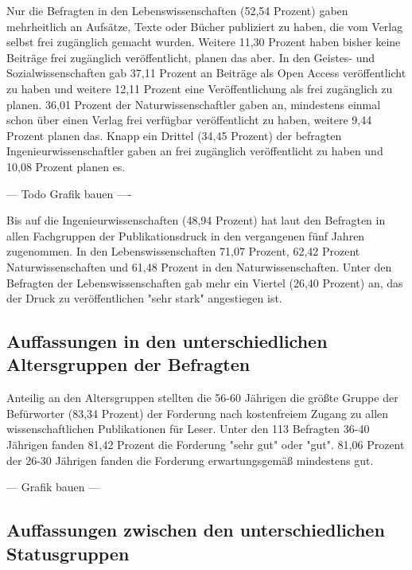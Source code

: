 Nur die Befragten in den Lebenswissenschaften (52,54 Prozent) gaben mehrheitlich an Aufsätze, Texte oder Bücher publiziert zu haben, die vom Verlag selbst frei zugänglich gemacht wurden. Weitere 11,30 Prozent haben bisher keine Beiträge frei zugänglich veröffentlicht, planen das aber. In den Geistes- und Sozialwissenschaften gab 37,11 Prozent an Beiträge als Open Access veröffentlicht zu haben und weitere 12,11 Prozent eine Veröffentlichung als frei zugänglich zu planen. 36,01 Prozent der Naturwissenschaftler gaben an, mindestens einmal schon über einen Verlag frei verfügbar veröffentlicht zu haben, weitere 9,44 Prozent planen das. Knapp ein Drittel (34,45 Prozent) der befragten Ingenieurwissenschaftler gaben an frei zugänglich veröffentlicht zu haben und 10,08 Prozent planen es.

--- Todo Grafik bauen ----

Bis auf die Ingenieurwissenschaften (48,94 Prozent) hat laut den Befragten in allen Fachgruppen der Publikationsdruck in den vergangenen fünf Jahren zugenommen. In den Lebenswissenschaften 71,07 Prozent, 62,42 Prozent Naturwissenschaften und 61,48 Prozent in den Naturwissenschaften. Unter den Befragten der Lebenswissenschaften gab mehr ein Viertel (26,40 Prozent) an, das der Druck zu veröffentlichen "sehr stark" angestiegen ist.

\subsection{Auffassungen in den unterschiedlichen Altersgruppen der Befragten}

Anteilig an den Altersgruppen stellten die 56-60 Jährigen die größte Gruppe der Befürworter (83,34 Prozent) der Forderung nach kostenfreiem Zugang zu allen wissenschaftlichen Publikationen für Leser. Unter den 113 Befragten 36-40 Jährigen fanden 81,42 Prozent die Forderung "sehr gut" oder "gut". 81,06 Prozent der 26-30 Jährigen fanden die Forderung erwartungsgemäß mindestens gut.

--- Grafik bauen ---

\subsection{Auffassungen zwischen den unterschiedlichen Statusgruppen}

